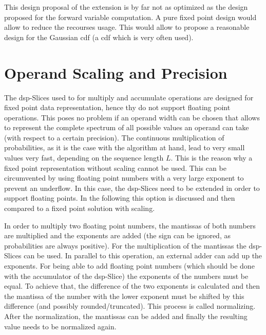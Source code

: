 \documentclass[mscthesis]{usiinfthesis}
\begin{document}
This design proposal of the extension is by far not as optimized as the design
proposed for the forward variable computation. A pure fixed point design
would allow to reduce the recourses usage. This would allow to propose
a reasonable design for the Gaussian \gls{cdf} (a \gls{cdf} which is very
often used).

\section{Operand Scaling and Precision}
\label{ch:design_scaling}

The \gls{dsp}-Slices used to for multiply and accumulate operations are designed for
fixed point data representation, hence thy do not support floating point
operations. This poses no problem if an operand width can be chosen that allows
to represent the complete spectrum of all possible values an operand can take
(with respect to a certain precision). The continuous multiplication of
probabilities, as it is the case with the algorithm at hand, lead to very small
values very fast, depending on the sequence length $L$. This is the reason why
a fixed point representation without scaling cannot be used. This can be
circumvented by using floating point numbers with a very large exponent to
prevent an underflow. In this case, the \gls{dsp}-Slices need to be extended in order
to support floating points. In the following this option is discussed and then
compared to a fixed point solution with scaling.

In order to multiply two floating point numbers, the mantissas of both numbers
are multiplied and the exponents are added (the sign can be ignored, as
probabilities are always positive). For the multiplication of the mantissas the
\gls{dsp}-Slices can be used. In parallel to this operation, an external adder can
add up the exponents. For being able to add floating point numbers (which
should be done with the accumulator of the \gls{dsp}-Slice) the exponents of the
numbers must be equal. To achieve that, the difference of the two exponents is
calculated and then the mantissa of the number with the lower exponent must be
shifted by this difference (and possibly rounded/truncated). This process is
called normalizing. After the normalization, the mantissas can be added and
finally the resulting value needs to be normalized again.
\end{document}
